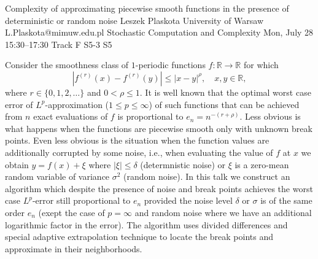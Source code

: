 \begin{talk}
  {Complexity of approximating piecewise smooth functions in the presence of deterministic or random noise}%
  {Leszek Plaskota}%
  {University of Warsaw}%
  {L.Plaskota@mimuw.edu.pl}%
  {Stochastic Computation and Complexity}%
  {}%
  {Mon, July 28 15:30–17:30 Track F}%
  {S5-3}%
  {S5}%
				
			
Consider the smoothness class of $1$-periodic functions $f:\mathbb R\to\mathbb R$ for which 
$$|f^{(r)}(x)-f^{(r)}(y)|\le |x-y|^\rho,\quad x,y\in\mathbb R,$$ 
where $r\in\{0,1,2,\ldots\}$ and $0<\rho\le 1.$ It is well known that the optimal worst case error of $L^p$-approximation ($1\le p\le\infty$) of such functions that can be achieved from $n$ exact evaluations of $f$ is proportional to $e_n=n^{-(r+\rho)}.$ Less obvious is what happens when the functions are piecewise smooth only with unknown break points. Even less obvious is the situation when the function values are additionally corrupted by some noise, i.e., when evaluating the value of $f$ at $x$ we obtain $y=f(x)+\xi$ where $|\xi|\le\delta$ (determnistic noise) or $\xi$ is a zero-mean random variable of variance $\sigma^2$ (random noise). In this talk we construct an algorithm which despite the presence of noise and break points achieves the worst case $L^p$-error still proportional to $e_n$ provided the noise level $\delta$ or $\sigma$ is of the same order $e_n$ (exept the case of $p=\infty$ and random noise where we have an additional logarithmic factor in the error). The algorithm uses divided differences and special adaptive extrapolation technique to locate the break points and approximate in their neighborhoods. 

\end{talk}

